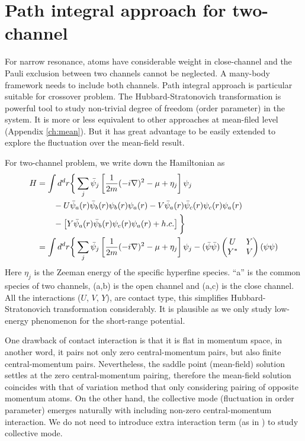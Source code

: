 
\chapter{Path integral approach for two-channel\label{ch:path2}}
For narrow resonance, atoms have considerable weight in close-channel and the Pauli exclusion between two channels cannot be neglected.  A many-body framework needs to include both channels.  Path integral approach is particular suitable for crossover problem.   The Hubbard-Stratonovich transformation is powerful tool to study non-trivial degree of freedom (order parameter) in the system.  It is more or less equivalent to other approaches at mean-filed level (Appendix \ref{ch:mean}). But it has great advantage to be easily extended to explore the fluctuation over the mean-field result.  

For two-channel problem, we write down the Hamiltonian as
\begin{equation}\label{eq:pathInt2:ham2}
\begin{split}
H&=\int{d^{d}r}\bigg\{\sum_{j}\bar\psi_{j}\left[\frac{1}{2m}(-i\nabla)^{2}-\mu+\eta_{j}\right]\psi_{j}\\
	&\qquad-U\bar\psi_{a}(r)\bar\psi_{b}(r)\psi_{b}(r)\psi_{a}(r)-V\bar\psi_{a}(r)\bar\psi_{c}(r)\psi_{c}(r)\psi_{a}(r)\\
	&\qquad-\left[Y\bar\psi_{a}(r)\bar\psi_{b}(r)\psi_{c}(r)\psi_{a}(r)+h.c.\right]
	\bigg\}\\
 &=\int{d^{d}r}\bigg\{\sum_{j}\bar\psi_{j}\left[\frac{1}{2m}(-i\nabla)^{2}-\mu+\eta_{j}\right]\psi_{j}
 	-(\bar\psi\bar\psi)\begin{pmatrix}U&Y\\Y^{*}&V\end{pmatrix}(\psi\psi)
\end{split}
\end{equation}
Here $\eta_{j}$ is the Zeeman energy of the specific hyperfine species.  ``a'' is the common species of two channels, (a,b) is the open channel and (a,c) is the close channel.  All the interactions ($U$, $V$, $Y$), are contact type, this simplifies Hubbard-Stratonovich transformation considerably.  It is plausible as we only study low-energy phenomenon for the short-range potential. 

One drawback of contact interaction is that it is flat in momentum space, in another word, it pairs not only zero central-momentum pairs, but also finite central-momentum pairs.  Nevertheless, the saddle point (mean-field) solution settles at the zero central-momentum pairing, therefore the mean-field solution coincides with that of  variation method that only considering pairing of opposite momentum atoms.  On the other hand, the collective mode (fluctuation in order parameter) emerges naturally with including non-zero central-momentum interaction.  We do not need to introduce extra interaction term (as in \cite{AndersonBCS}) to study collective mode.   

